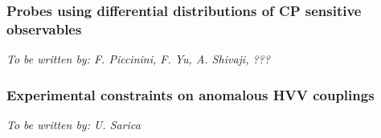 \subsubsection{Probes using differential distributions of CP sensitive observables}
\begin{center}{\it To be written by: F. Piccinini, F. Yu, A. Shivaji, ???} \end{center}


\subsubsection{Experimental constraints on anomalous HVV couplings}
\begin{center}{\it To be written by: U. Sarica} \end{center}

